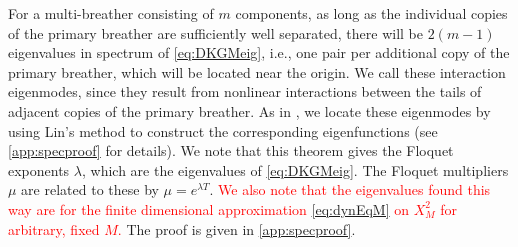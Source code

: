 \documentclass[12pt,reqno]{amsart}
\theoremstyle{definition}
\newcommand{\revised}[1]{ \textcolor{red}{#1} }
\begin{document}
For a multi-breather consisting of $m$ components, as long as the individual copies of the primary breather are sufficiently well separated, there will be $2(m-1)$ eigenvalues in spectrum of \cref{eq:DKGMeig}, i.e., one pair per additional copy of the primary breather, which will be located near the origin. We call these interaction eigenmodes, since they result from nonlinear interactions between the tails of adjacent copies of the primary breather.
As in \cites{Parker2020,Sandstede1998}, we locate these eigenmodes by using Lin's method to construct the corresponding eigenfunctions (see \cref{app:specproof} for details). We note that this theorem gives the Floquet exponents $\lambda$, which are the eigenvalues of \cref{eq:DKGMeig}. The Floquet multipliers $\mu$ are related to these by $\mu = e^{\lambda T}$. 
\revised{
We also note that the eigenvalues found this way are for the finite dimensional approximation \cref{eq:dynEqM} on $X_{M}^2$ for arbitrary, fixed $M$.
}
The proof is given in \cref{app:specproof}.
\end{document}
